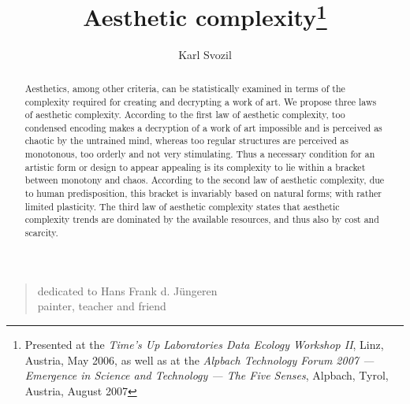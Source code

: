 \documentclass[rmp,amssymb,showpacs,showkeys,12pt,preprint]{revtex4}
\begin{document}
\colourcoverpage



\title{Aesthetic complexity\footnote{
Presented at the
{\em Time's Up Laboratories Data Ecology Workshop II}, Linz, Austria, May 2006,
as well as at the
{\em Alpbach Technology Forum 2007 --- Emergence in Science and Technology --- The Five Senses}, Alpbach, Tyrol, Austria, August 2007
}
}

\author{Karl Svozil}




\begin{abstract}
Aesthetics, among other criteria, can be statistically examined in terms of the complexity required for creating and decrypting a work of art.
We propose three laws of aesthetic complexity.
According to the first law of aesthetic complexity, too condensed encoding makes a decryption of a work of art impossible and is perceived as chaotic by the untrained mind, whereas too regular structures are perceived as monotonous, too orderly and not very stimulating.
Thus a necessary condition for an artistic form or design to appear appealing is its complexity to lie within a bracket between monotony and chaos.
According to the second law of aesthetic complexity, due to human predisposition, this bracket is invariably based on natural forms; with rather limited plasticity.
The third law of aesthetic complexity states that aesthetic complexity trends are dominated by the available resources, and thus also by cost and scarcity.
\end{abstract}

\maketitle

\begin{quote}
\begin{flushright}
{\footnotesize
dedicated to Hans Frank d. J\"ungeren\\
painter, teacher and friend}
\end{flushright}
\end{quote}
\end{document}
